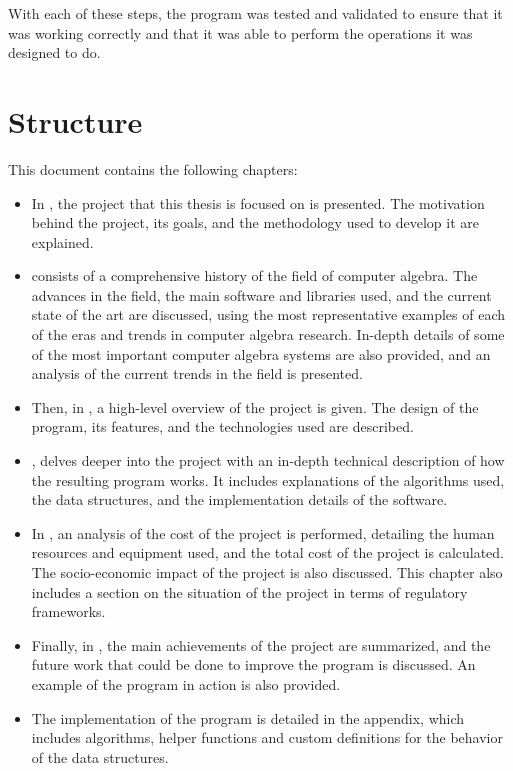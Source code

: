With each of these steps, the program was tested and validated to ensure that it was working correctly and that it was able to perform the operations it was designed to do.

\section{Structure}\label{sec:structure}
This document contains the following chapters:
\begin{itemize}
  \item In , the project that this thesis is focused on is presented. The motivation behind the project, its goals, and the methodology used to develop it are explained.
  \item {} consists of a comprehensive history of the field of computer algebra. The advances in the field, the main software and libraries used, and the current state of the art are discussed, using the most representative examples of each of the eras and trends in computer algebra research. In-depth details of some of the most important computer algebra systems are also provided, and an analysis of the current trends in the field is presented.
  \item Then, in , a high-level overview of the project is given. The design of the program, its features, and the technologies used are described.
  \item {}, delves deeper into the project with an in-depth technical description of how the resulting program works. It includes explanations of the algorithms used, the data structures, and the implementation details of the software.
  \item In , an analysis of the cost of the project is performed, detailing the human resources and equipment used, and the total cost of the project is calculated. The socio-economic impact of the project is also discussed. This chapter also includes a section on the situation of the project in terms of regulatory frameworks.
  \item Finally, in , the main achievements of the project are summarized, and the future work that could be done to improve the program is discussed. An example of the program in action is also provided.
  \item The implementation of the program is detailed in the appendix, which includes algorithms, helper functions and custom definitions for the behavior of the data structures.
\end{itemize}
